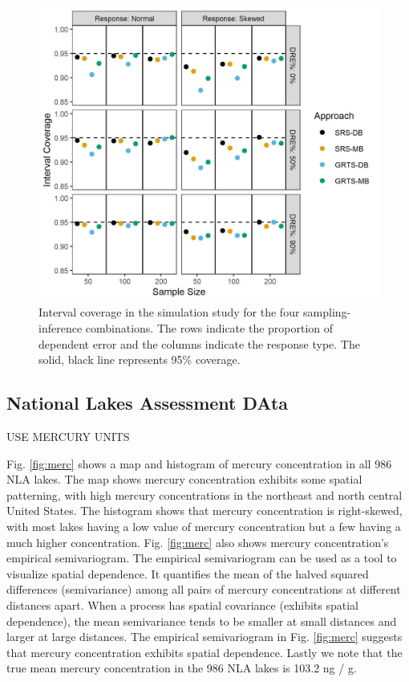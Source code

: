 \documentclass[]{elsarticle} %
\begin{document}
\begin{figure}
  \centering
  \includegraphics[width = 1\linewidth]{figures/coverage.jpeg}
  \caption{Interval coverage in the simulation study for the four sampling-inference combinations. The rows indicate the proportion of dependent error and the columns indicate the response type. The solid, black line represents 95\% coverage.}
  \label{fig:figconf}
\end{figure}

\hypertarget{sec:r_app}{%
\subsection{National Lakes Assessment DAta}\label{sec:r_app}}

USE MERCURY UNITS

Fig. \ref{fig:merc} shows a map and histogram of mercury concentration
in all 986 NLA lakes. The map shows mercury concentration exhibits some
spatial patterning, with high mercury concentrations in the northeast
and north central United States. The histogram shows that mercury
concentration is right-skewed, with most lakes having a low value of
mercury concentration but a few having a much higher concentration. Fig.
\ref{fig:merc} also shows mercury concentration's empirical
semivariogram. The empirical semivariogram can be used as a tool to
visualize spatial dependence. It quantifies the mean of the halved
squared differences (semivariance) among all pairs of mercury
concentrations at different distances apart. When a process has spatial
covariance (exhibits spatial dependence), the mean semivariance tends to
be smaller at small distances and larger at large distances. The
empirical semivariogram in Fig. \ref{fig:merc} suggests that mercury
concentration exhibits spatial dependence. Lastly we note that the true
mean mercury concentration in the 986 NLA lakes is 103.2 ng / g.
\end{document}

